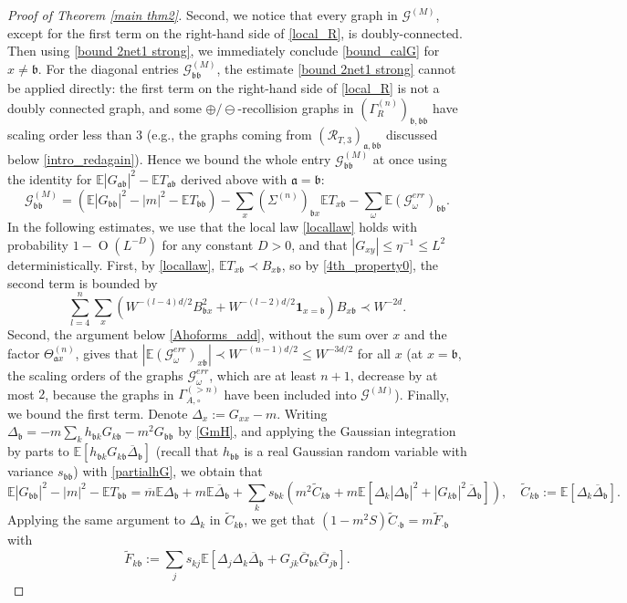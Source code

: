 \documentclass{article}
\newcommand{\1}{\mathds{1}}
\numberwithin{equation}{section}
\newcommand{\fa}{{\mathfrak a}}
\newcommand{\fb}{{\mathfrak b}}
\renewcommand{\cal}{\mathcal}
\newcommand{\wt}{\widetilde}
\renewcommand{\leq}{\leqslant}
\renewcommand{\le}{\leq}
\newcommand{\E}{\mathbb{E}}
\DeclareMathOperator{\OO}{O}
\theoremstyle{plain} %
\theoremstyle{remark}
\newcommand{\wtSdeltan}{\Sigma^{(n)}}
\begin{document}
\begin{proof}[Proof of Theorem \ref{main thm2}]
Second, we notice that every graph in $\cal G^{(M)}$, except for the first term on the right-hand side of \eqref{local_R}, is doubly-connected. Then using \eqref{bound 2net1 strong}, we immediately conclude \eqref{bound_calG} for $x\ne \fb$. For the diagonal entries $\cal G^{(M)}_{\fb\fb}$, the estimate \eqref{bound 2net1 strong} cannot be applied directly: the first term on the right-hand side of \eqref{local_R} is not a doubly connected graph, and some $\oplus/\ominus$-recollision graphs in $(\Gamma_R^{(n)})_{\fb,\fb\fb}$ have scaling order less than $3$ (e.g., the graphs coming from $(\cal R_{T,3})_{\fa,\fb\fb}$ discussed below \eqref{intro_redagain}). Hence we bound the whole entry $\cal G^{(M)}_{\fb\fb}$ at once using the identity for $\E|G_{\fa\fb}|^2-\E T_{\fa\fb}$ derived above with $\fa=\fb$:
$$\cal G^{(M)}_{\fb\fb}=\left(\E|G_{\fb\fb}|^2-|m|^2-\E T_{\fb\fb}\right)-\sum_x(\wtSdeltan)_{\fb x}\E T_{x\fb}-\sum_\omega\E\left(\cal G^{err}_\omega\right)_{\fb\fb}.$$
In the following estimates, we use that the local law \eqref{locallaw} holds with probability $1-\OO(L^{-D})$ for any constant $D>0$, and that $|G_{xy}|\le \eta^{-1}\le L^2$ deterministically. First, by \eqref{locallaw}, $\E T_{x\fb}\prec B_{x\fb}$, so by \eqref{4th_property0}, the second term is bounded by
$$\sum_{l=4}^n\sum_x\left(W^{-(l-4)d/2}B_{\fb x}^2+W^{-(l-2)d/2}\mathbf 1_{x=\fb}\right)B_{x\fb}\prec W^{-2d}.$$
Second, the argument below \eqref{Ahoforms_add}, without the sum over $x$ and the factor $\Theta^{(n)}_{\fa x}$, gives that $|\E(\cal G^{err}_\omega)_{x\fb}|\prec W^{-(n-1)d/2}\le W^{-3d/2}$ for all $x$ (at $x=\fb$, the scaling orders of the graphs $\cal G^{err}_\omega$, which are at least $n+1$, decrease by at most $2$, because the graphs in $\Gamma_{A,\circ}^{(>n)}$ have been included into $\cal G^{(M)}$). Finally, we bound the first term. Denote $\Delta_x:=G_{xx}-m$. Writing $\Delta_\fb=-m\sum_k h_{\fb k}G_{k\fb}-m^2G_{\fb\fb}$ by \eqref{GmH}, and applying the Gaussian integration by parts to $\E[h_{\fb k}G_{k\fb}\overline \Delta_\fb]$ (recall that $h_{\fb\fb}$ is a real Gaussian random variable with variance $s_{\fb\fb}$) with \eqref{partialhG}, we obtain that 
$$\E|G_{\fb\fb}|^2-|m|^2-\E T_{\fb\fb}=\overline m\E\Delta_\fb+m\E\overline\Delta_\fb+\sum_k s_{\fb k}\left(m^2\wt C_{k\fb}+m\E\left[\Delta_k|\Delta_\fb|^2+|G_{k\fb}|^2\overline\Delta_\fb\right]\right),\quad \wt C_{k\fb}:=\E\left[\Delta_k\overline\Delta_\fb\right].$$
Applying the same argument to $\Delta_k$ in $\wt C_{k\fb}$, we get that $(1-m^2S)\wt C_{\cdot\fb}=m\wt F_{\cdot\fb}$ with 
$$\wt F_{k\fb}:=\sum_j s_{kj}\E\left[\Delta_j\Delta_k\overline\Delta_\fb+G_{jk}\overline G_{\fb k}\overline G_{j\fb}\right].$$

\end{proof}
\end{document}
